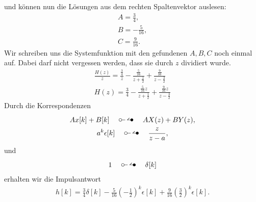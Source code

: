 \documentclass[11pt,a4paper,DIV=12]{scrartcl}
\begin{document}
%
%
%
und können nun die Lösungen aus dem rechten Spaltenvektor auslesen:
%
\begin{gather}
	A=\frac{3}{4},\\
	B=-\frac{5}{16},\\
	C=\frac{9}{16}.
\end{gather}
%
Wir schreiben uns die Systemfunktion mit den gefundenen $A,B,C$ noch einmal auf.
%
Dabei darf nicht vergessen werden, dass sie durch $z$ dividiert wurde.
%
\begin{gather}
	\frac{H(z)}{z}=
	\frac{\frac{3}{4}}{z} - \frac{\frac{5}{16}}{z+\frac{1}{2}} + \frac{\frac{9}{16}}{z-\frac{3}{2}}\\
	H(z) =\frac{3}{4} - \frac{\frac{5}{16} z}{z+\frac{1}{2}} + \frac{\frac{9}{16} z}{z-\frac{3}{2}}
\end{gather}
%
Durch die Korrespondenzen
%
\begin{gather}
	Ax[k]+B[k]\quad\ztransf\quad AX(z)+BY(z),\\
	a^k\epsilon[k]\quad\ztransf\quad \frac{z}{z-a},
\end{gather}
%
und
%
\begin{gather}
	1\quad\ztransf\quad \delta[k]
\end{gather}
%
erhalten wir die Impulsantwort
%
\begin{gather}
	h[k] =
	\frac{3}{4} \delta[k] - \frac{5}{16}\left(-\frac{1}{2}\right)^k \epsilon[k] + \frac{9}{16}\left(\frac{3}{2}\right)^k \epsilon[k].
\end{gather}
%
\newpage
\end{document}
